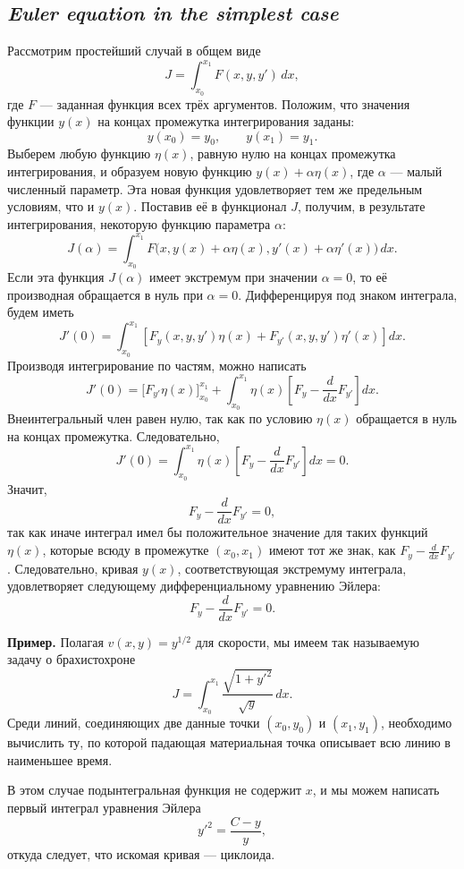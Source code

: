 \subsection*{ \textit{Euler equation in the simplest case}}
\begin{rusblock}
Рассмотрим простейший случай в общем виде
\[
J=\int_{x_0}^{x_1}F(x,y,y')\,dx,
\]
где $F$ --- заданная функция всех трёх аргументов. Положим, что значения функции $y(x)$ на концах промежутка интегрирования заданы:
\[
y(x_0)=y_0,\qquad y(x_1)=y_1.
\]
Выберем любую функцию $\eta(x)$, равную нулю на концах промежутка интегрирования, и образуем новую функцию $y(x)+\alpha\eta(x)$, где $\alpha$ --- малый численный параметр. Эта новая функция удовлетворяет тем же предельным условиям, что и $y(x)$. Поставив её в функционал $J$, получим, в результате интегрирования, некоторую функцию параметра $\alpha$:
\[
J(\alpha)=\int_{x_0}^{x_1}F\bigl(x,y(x)+\alpha\eta(x),y'(x)+\alpha\eta'(x)\bigr)\,dx.
\]
Если эта функция $J(\alpha)$ имеет экстремум при значении $\alpha=0$, то её производная обращается в нуль при $\alpha=0$. Дифференцируя под знаком интеграла, будем иметь
\[
J'(0)=\int_{x_0}^{x_1}\left[F_y(x,y,y')\eta(x)+F_{y'}(x,y,y')\eta'(x)\right]dx.
\]
Производя интегрирование по частям, можно написать
\[
\tag{10}
J'(0)=\bigl[F_{y'}\eta(x)\bigr]_{x_0}^{x_1}
+\int_{x_0}^{x_1}\eta(x)\left[F_y-\frac{d}{dx}F_{y'}\right]dx.
\]
Внеинтегральный член равен нулю, так как по условию $\eta(x)$ обращается в нуль на концах промежутка. Следовательно,
\[
J'(0)=\int_{x_0}^{x_1}\eta(x)\left[F_y-\frac{d}{dx}F_{y'}\right]dx=0.
\]
Значит,
\[
F_y-\frac{d}{dx}F_{y'}=0,
\]
так как иначе интеграл имел бы положительное значение для таких функций $\eta(x)$, которые всюду в промежутке $(x_0,x_1)$ имеют тот же знак, как $F_y-\frac{d}{dx}F_{y'}$. Следовательно, кривая $y(x)$, соответствующая экстремуму интеграла, удовлетворяет следующему дифференциальному уравнению Эйлера:
\[
F_y-\frac{d}{dx}F_{y'}=0.
\]
\end{rusblock}

\begin{rusblock}
\textbf{Пример.} Полагая $v(x,y)=y^{1/2}$ для скорости, мы имеем так называемую задачу о брахистохроне
\[
J=\int_{x_0}^{x_1}\frac{\sqrt{1+y'^2}}{\sqrt y}\,dx.
\]
Среди линий, соединяющих две данные точки $(x_0,y_0)$ и $(x_1,y_1)$, необходимо вычислить ту, по которой падающая материальная точка описывает всю линию в наименьшее время.

В этом случае подынтегральная функция не содержит $x$, и мы можем написать первый интеграл уравнения Эйлера
\[
y'^2=\frac{C-y}{y},
\]
откуда следует, что искомая кривая --- циклоида.
\end{rusblock}


